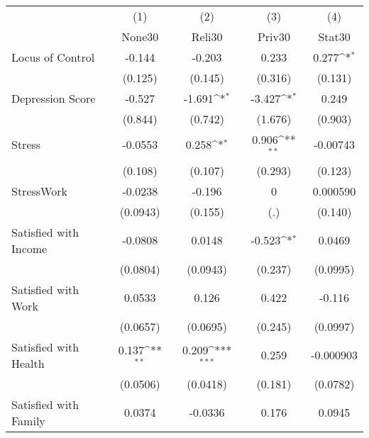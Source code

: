 {
\def\sym#1{\ifmmode^{#1}\else\(^{#1}\)\fi}
\begin{tabular}{l*{4}{c}}
\hline\hline
            &\multicolumn{1}{c}{(1)}&\multicolumn{1}{c}{(2)}&\multicolumn{1}{c}{(3)}&\multicolumn{1}{c}{(4)}\\
            &\multicolumn{1}{c}{None30}&\multicolumn{1}{c}{Reli30}&\multicolumn{1}{c}{Priv30}&\multicolumn{1}{c}{Stat30}\\
\hline
Locus of Control&      -0.144         &      -0.203         &       0.233         &       0.277\sym{*}  \\
            &     (0.125)         &     (0.145)         &     (0.316)         &     (0.131)         \\
[1em]
Depression Score&      -0.527         &      -1.691\sym{*}  &      -3.427\sym{*}  &       0.249         \\
            &     (0.844)         &     (0.742)         &     (1.676)         &     (0.903)         \\
[1em]
Stress      &     -0.0553         &       0.258\sym{*}  &       0.906\sym{**} &    -0.00743         \\
            &     (0.108)         &     (0.107)         &     (0.293)         &     (0.123)         \\
[1em]
StressWork  &     -0.0238         &      -0.196         &           0         &    0.000590         \\
            &    (0.0943)         &     (0.155)         &         (.)         &     (0.140)         \\
[1em]
Satisfied with Income&     -0.0808         &      0.0148         &      -0.523\sym{*}  &      0.0469         \\
            &    (0.0804)         &    (0.0943)         &     (0.237)         &    (0.0995)         \\
[1em]
Satisfied with Work&      0.0533         &       0.126         &       0.422         &      -0.116         \\
            &    (0.0657)         &    (0.0695)         &     (0.245)         &    (0.0997)         \\
[1em]
Satisfied with Health&       0.137\sym{**} &       0.209\sym{***}&       0.259         &   -0.000903         \\
            &    (0.0506)         &    (0.0418)         &     (0.181)         &    (0.0782)         \\
[1em]
Satisfied with Family&      0.0374         &     -0.0336         &       0.176         &      0.0945         \\

\end{tabular}}
